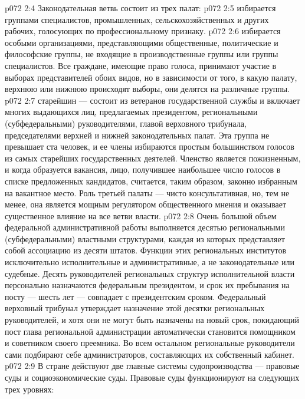 \vs p072 2:4 \pc Законодательная ветвь состоит из трех палат:
\vs p072 2:5 \bibnobreakspace {} избирается группами специалистов, промышленных, сельскохозяйственных и других рабочих, голосующих по профессиональному признаку.
\vs p072 2:6 \pc {}\bibnobreakspace {} избирается особыми организациями, представляющими общественные, политические и философские группы, не входящие в производственные группы или группы специалистов. Все граждане, имеющие право голоса, принимают участие в выборах представителей обоих видов, но в зависимости от того, в какую палату, верхнюю или нижнюю происходят выборы, они делятся на различные группы.
\vs p072 2:7 \pc {}\bibnobreakspace {} старейшин --- состоит из ветеранов государственной службы и включает многих выдающихся лиц, предлагаемых президентом, региональными (субфедеральными) руководителями, главой верховного трибунала, председателями верхней и нижней законодательных палат. Эта группа не превышает ста человек, и ее члены избираются простым большинством голосов из самых старейших государственных деятелей. Членство является пожизненным, и когда образуется вакансия, лицо, получившее наибольшее число голосов в списке предложенных кандидатов, считается, таким образом, законно избранным на вакантное место. Роль третьей палаты --- чисто консультативная, но, тем не менее, она является мощным регулятором общественного мнения и оказывает существенное влияние на все ветви власти.
\vs p072 2:8 \pc Очень большой объем федеральной административной работы выполняется десятью региональными (субфедеральными) властными структурами, каждая из которых представляет собой ассоциацию из десяти штатов. Функции этих региональных институтов исключительно исполнительные и административные, а не законодательные или судебные. Десять руководителей региональных структур исполнительной власти персонально назначаются федеральным президентом, и срок их пребывания на посту --- шесть лет --- совпадает с президентским сроком. Федеральный верховный трибунал утверждает назначение этой десятки региональных руководителей, и хотя они не могут быть назначены на новый срок, покидающий пост глава региональной администрации автоматически становится помощником и советником своего преемника. Во всем остальном региональные руководители сами подбирают себе администраторов, составляющих их собственный кабинет.
\vs p072 2:9 \pc В стране действуют две главные системы судопроизводства --- правовые суды и социоэкономические суды. Правовые суды функционируют на следующих трех уровнях:
